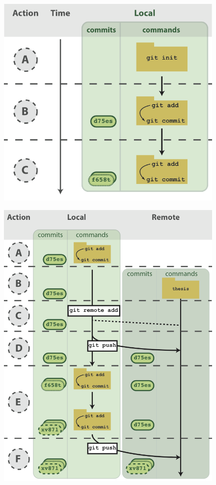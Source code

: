 \documentclass[10pt]{article}
\begin{document}
\begin{figure}[h!]
\begin{center}
\includegraphics[width=0.7\columnwidth]{figures/Fig2/Fig2.png}
\caption{\textbf{\label{fig:Fig2}}
%
}
\end{center}
\end{figure}

\begin{figure}[h!]
\begin{center}
\includegraphics[width=0.7\columnwidth]{figures/Fig3/Fig3.png}
\caption{\textbf{\label{fig:Fig3}}
%
}
\end{center}
\end{figure}
\end{document}
